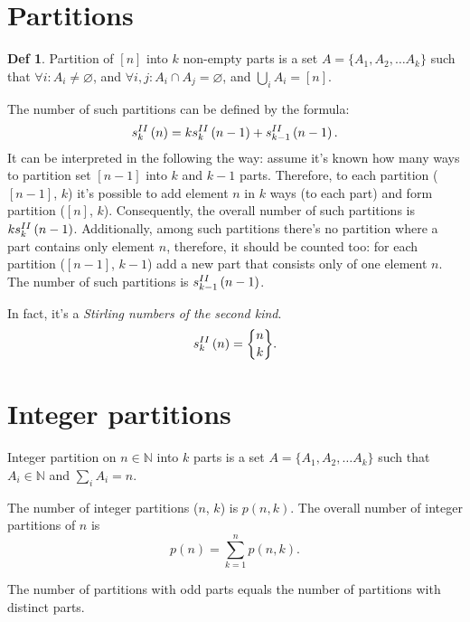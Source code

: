 \documentclass[a4paper]{article}
\theoremstyle{definition}
\newtheorem{definition}{Def}
\begin{document}
\section{Partitions}

\begin{definition}
  Partition of \([n]\) into \(k\) non-empty parts is
  a set \(A = \{A_1, A_2, \ldots A_k\}\)
  such that \(\forall i : A_i \neq \varnothing\),
  and \(\forall i, j : A_i \cap A_j = \varnothing\),
  and \(\bigcup_i A_i = [n]\).
\end{definition}

The number of such partitions can be defined by the formula:
\[
  s_{k}^{II}\left(n\right) = k s_{k}^{II}\left(n - 1\right) + s_{k - 1}^{II}\left(n - 1\right)
.\]
It can be interpreted in the following the way:
assume it's known how many ways to partition
set \([n - 1]\) into \(k\) and \(k - 1\) parts.
Therefore, to each partition (\([n - 1]\), \(k\)) it's possible
to add element \(n\) in \(k\) ways (to each part) and form partition (\([n]\),
\(k\)).
Consequently, the overall number of such partitions is \(k s_{k}^{II}\left(n - 1\right)\).
Additionally, among such partitions there's no partition where a part contains
only element \(n\), therefore, it should be counted too: for each partition
(\([n - 1]\), \(k - 1\)) add a new part that consists only of one element
\(n\). The number of such partitions is \(s_{k - 1}^{II}\left(n - 1\right)\).

In fact, it's a \textit{Stirling numbers of the second kind}.
\[
  \StIn{k}{n} = \stirling{n}{k}
.\]

\section{Integer partitions}
  Integer partition on \(n \in \mathbb{N}\) into \(k\) parts is a set
  \(A = \{A_1, A_2, \ldots A_k\}\) such that \(A_i \in \mathbb{N}\)
  and \(\sum_{i} A_i = n\).

The number of integer partitions (\(n\), \(k\)) is \(p(n, k)\).
The overall number of integer partitions of \(n\) is
\[
  p(n) = \sum_{k = 1}^{n} p(n, k)
.\]

The number of partitions with odd parts equals the number of partitions with
distinct parts.
\end{document}
